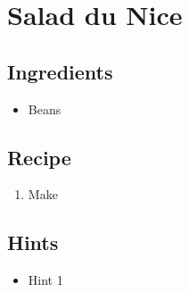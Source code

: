 \section{Salad du Nice}
\subsection*{Ingredients}
\begin{itemize}
    \item Beans
\end{itemize}

\subsection*{Recipe}
\begin{enumerate}
    \item Make
\end{enumerate}

\subsection*{Hints}
\begin{itemize}
    \item Hint 1
\end{itemize}
\newpage